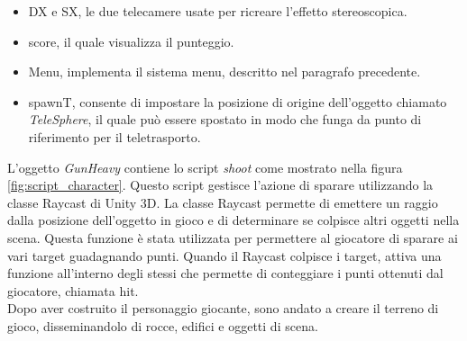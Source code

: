 \documentclass[
a4paper,
cleardoublepage=empty,
headings=twolinechapter,
numbers=autoenddot,
]{scrbook}
\begin{document}
    \begin{itemize}
        \item DX e SX, le due telecamere usate per ricreare l'effetto stereoscopica.
        \item score, il quale visualizza il punteggio.
        \item Menu, implementa il sistema menu, descritto nel paragrafo precedente.
        \item spawnT, consente di impostare la posizione di origine dell'oggetto chiamato \textit{TeleSphere}, il quale può essere spostato in modo che funga da punto di riferimento per il teletrasporto.
    \end{itemize}
    L'oggetto \textit{GunHeavy} contiene lo script \textit{shoot} come mostrato nella figura \ref{fig:script_character}. Questo script gestisce l'azione di sparare utilizzando la classe Raycast di Unity 3D. La classe Raycast permette di emettere un raggio dalla posizione dell'oggetto in gioco e di determinare se colpisce altri oggetti nella scena. Questa funzione è stata utilizzata per permettere al giocatore di sparare ai vari target guadagnando punti.
    Quando il Raycast colpisce i target, attiva una funzione all'interno degli stessi che permette di conteggiare i punti ottenuti dal giocatore, chiamata hit.\\
    Dopo aver costruito il personaggio giocante, sono andato a creare il terreno di gioco, disseminandolo di rocce, edifici e oggetti di scena.
\end{document}
